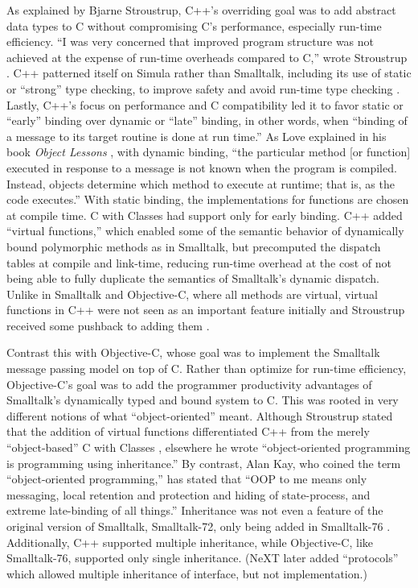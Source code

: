 \documentclass[acmsmall]{acmart}\settopmatter{}
\begin{document}
As explained by Bjarne Stroustrup, C++'s overriding goal was to add abstract data types to C without compromising C's performance, especially run-time efficiency. ``I was very concerned that improved program structure was not achieved at the expense of run-time overheads compared to C,'' wrote Stroustrup \citetext{\citeyear[5]{stroustrup_history_1993}}. C++ patterned itself on Simula rather than Smalltalk, including its use of static or ``strong'' type checking, to improve safety and avoid run-time type checking \citep[30--31]{stroustrup_history_1993}. Lastly, C++'s focus on performance and C compatibility led it to favor static or ``early'' binding over dynamic or ``late'' binding, in other words, when ``binding of a message to its target routine is done at run time.'' \citep[15]{cox_object_1983} As Love explained in his book \emph{Object Lessons} \citep[29]{love_object_1995}, with dynamic binding, ``the particular method [or function] executed in response to a message is not known when the program is compiled. Instead, objects determine which method to execute at runtime; that is, as the code executes.'' With static binding, the implementations for functions are chosen at compile time. C with Classes had support only for early binding. C++ added ``virtual functions,'' which enabled some of the semantic behavior of dynamically bound polymorphic methods as in Smalltalk, but precomputed the dispatch tables at compile and link-time, reducing run-time overhead at the cost of not being able to fully duplicate the semantics of Smalltalk's dynamic dispatch. Unlike in Smalltalk and Objective-C, where all methods are virtual, virtual functions in C++ were not seen as an important feature initially and Stroustrup received some pushback to adding them  \citep[23]{stroustrup_history_1993}.

Contrast this with Objective-C, whose goal was to implement the Smalltalk message passing model on top of C. Rather than optimize for run-time efficiency, Objective-C's goal was to add the programmer productivity advantages of Smalltalk's dynamically typed and bound system to C. This was rooted in very different notions of what ``object-oriented'' meant. Although Stroustrup stated that the addition of virtual functions differentiated C++ from the merely ``object-based'' C with Classes \citep[22]{stroustrup_history_1993}, elsewhere he wrote ``object-oriented programming is programming using inheritance.'' \citep[30]{stroustrup_history_1993} By contrast, Alan Kay, who coined the term ``object-oriented programming,'' has stated that ``OOP to me means only messaging, local retention and protection and hiding of state-process, and extreme late-binding of all things.''  Inheritance was not even a feature of the original version of Smalltalk, Smalltalk-72, only being added in Smalltalk-76 \citep[84]{kay_early_1993}. Additionally, C++ supported multiple inheritance, while Objective-C, like Smalltalk-76, supported only single inheritance. (NeXT later added ``protocols'' which allowed multiple inheritance of interface, but not implementation.)
\end{document}
